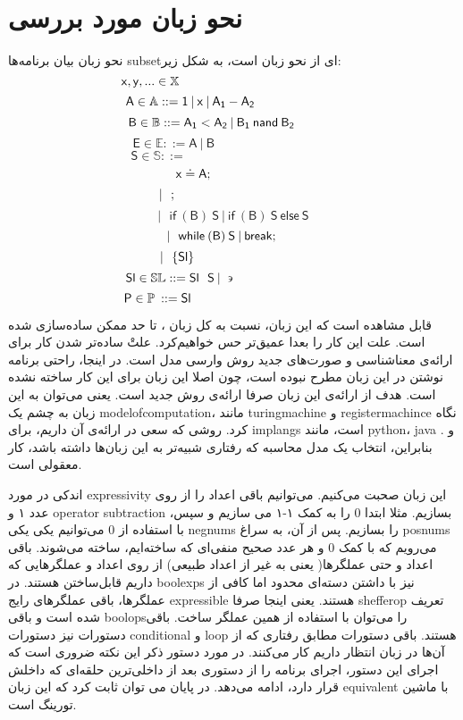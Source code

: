 \section{نحو زبان مورد بررسی‬}
نحو زبان بیان برنامه‌ها \gls*{subset}ای از نحو زبان  است، به شکل زیر:
$$\mathsf{x,y},... \in \mathbb{X}\hspace{4.65cm}$$
$$\mathsf{A} \in \mathbb{A} ::=\mathsf{1\:|\:x\:|\:A_1 - A_2\hspace{2.4cm}}$$  
$$\mathsf{B \in \mathbb{B} ::=A_1<A_2 \:|\: B_1 \: nand\: B_2\hspace{1.2cm}}$$
$$\mathsf{E \in \mathbb{E}::= A \: | \: B\hspace{4cm}}$$
$$\mathsf{S\in \mathbb{S} ::=\hspace{5cm}  }$$
$$\mathsf{x\doteq A; \hspace{2.25cm}}$$
$$\mathsf{|\:\:\:;\hspace{3.75cm}}$$
$$\mathsf{|\:\:\:if\:(B)\:S\:|\:if\:(B)\:S\:else\:S}$$
$$\mathsf{|\:\:\:while\:(B)\:S\: | \: break;\hspace{0.65cm}}$$
$$\mathsf{|\:\:\:\{Sl\}\hspace{3.15cm}}$$
$$\mathsf{Sl \in \mathbb{SL}::=Sl\:\:\:S\:|\:\backepsilon}\hspace{3.05cm}$$
$$\mathsf{P\in \mathbb{P}\:::=Sl}\hspace{4.25cm}$$

\vspace{1cm}
قابل مشاهده است که این زبان، نسبت به کل زبان ، تا حد ممکن ساده‌سازی شده است. علت این کار را بعدا عمیق‌تر حس خواهیم‌کرد. علتْ ساده‌تر شدن کار برای ارائه‌ی معناشناسی و صورت‌های جدید روش وارسی مدل است. در اینجا، راحتی برنامه نوشتن در این زبان مطرح نبوده است، چون اصلا این زبان برای این کار ساخته نشده است. هدف از ارائه‌ی این زبان صرفا ارائه‌ی روش جدید است. یعنی می‌توان به این زبان به چشم یک \gls*{modelofcomputation}، مانند \gls{turingmachine} و \gls{registermachince} نگاه کرد. روشی که سعی در ارائه‌‌ی آن داریم، برای \glspl*{implang} است، مانند \gls{python}، \gls{java} و . بنابراین، انتخاب یک مدل محاسبه که رفتاری شبیه‌تر به این زبان‌ها داشته باشد، کار معقولی است.

اندکی در مورد \gls*{expressivity} این زبان صحبت می‌کنیم. می‌توانیم باقی اعداد را از روی عدد ۱ و \gls*{operator} \gls*{subtraction} بسازیم. مثلا ابتدا 0 را به کمک ۱-۱ می سازیم و سپس، با استفاده از 0 می‌توانیم یکی یکی \glspl*{negnum} را بسازیم. پس از آن، به سراغ \glspl*{posnum} می‌رویم که با کمک 0 و هر عدد صحیح منفی‌ای که ساخته‌ایم، ساخته می‌شوند. باقی اعداد و حتی عملگر‌ها( یعنی به غیر از اعداد طبیعی) از روی اعداد و عملگرهایی که داریم قابل‌ساختن هستند. در \glspl{boolexp} نیز با داشتن دسته‌‌ای محدود اما کافی از عملگر‌ها، باقی عملگر‌های رایج \gls*{expressible} هستند. یعنی اینجا صرفا \gls{shefferop} تعریف شده است و باقی \glspl{boolop}را می‌توان با استفاده از همین عملگر ساخت. باقی دستورات نیز دستورات \gls*{conditional} و \gls*{loop} هستند. باقی دستورات مطابق رفتاری که از آن‌ها در زبان  انتظار داریم کار می‌کنند. در مورد دستور  ذکر این نکته ضروری است که اجرای این دستور، اجرای برنامه را از دستوری بعد از داخلی‌ترین حلقه‌ای که  داخلش قرار دارد، ادامه می‌‌دهد. در پایان می توان ثابت کرد که این زبان \gls*{equivalent} با ماشین تورینگ\cite{davis} است. 

